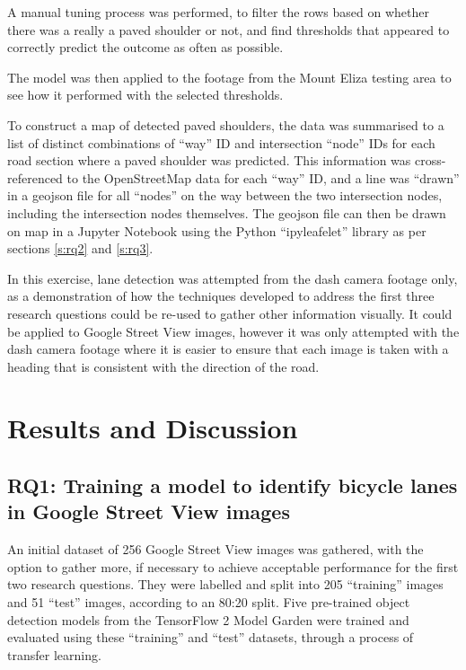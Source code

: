\documentclass[11pt,twoside]{report}
\begin{document}
A manual tuning process was performed, to filter the rows based on whether there was a really a paved shoulder or not, and find thresholds that appeared to correctly predict the outcome as often as possible.

The model was then applied to the footage from the Mount Eliza testing area to see how it performed with the selected thresholds.

To construct a map of detected paved shoulders, the data was summarised to a list of distinct combinations of ``way'' ID and intersection ``node'' IDs for each road section where a paved shoulder was predicted.  This information was cross-referenced to the OpenStreetMap data for each ``way'' ID, and a line was ``drawn'' in a geojson file for all ``nodes'' on the way between the two intersection nodes, including the intersection nodes themselves.  The geojson file can then be drawn on map in a Jupyter Notebook using the Python ``ipyleafelet'' library as per sections \ref{s:rq2} and \ref{s:rq3}.

In this exercise, lane detection was attempted from the dash camera footage only, as a demonstration of how the techniques developed to address the first three research questions could be re-used to gather other information visually.  It could be applied to Google Street View images, however it was only attempted with the dash camera footage where it is easier to ensure that each image is taken with a heading that is consistent with the direction of the road.  


\chapter{Results and Discussion}
\label{s:results}


\section{RQ1: Training a model to identify bicycle lanes in Google Street View images}
\label{results:rq1}


An initial dataset of 256 Google Street View images was gathered, with the option to gather more, if necessary to achieve acceptable performance for the first two research questions.  They were labelled and split into 205 ``training''  images and 51 ``test'' images, according to an 80:20 split.  Five pre-trained object detection models from the TensorFlow 2 Model Garden were trained and evaluated using these ``training'' and ``test'' datasets, through a process of transfer learning.
\end{document}
